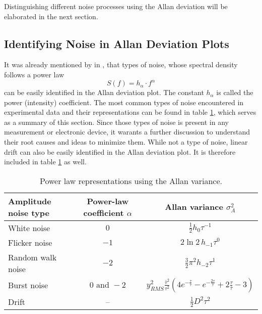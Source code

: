 Distinguishing different noise processes using the Allan deviation will be elaborated in the next section.

\subsection{Identifying Noise in Allan Deviation Plots}
It was already mentioned by \citeauthor{adev} in \cite{adev}, that types of noise, whose spectral density follows a power law
\begin{equation}
    S(f) = h_{\alpha} \cdot f^\alpha \label{eqn:power_law}
\end{equation}
can be easily identified in the Allan deviation plot. The constant $h_\alpha$ is called the power (intensity) coefficient. The most common types of noise encountered in experimental data and their representations can be found in table \ref{tab:adev_alpha}, which serves as a summary of this section. Since those types of noise is present in any measurement or electronic device, it warants a further discussion to understand their root causes and ideas to minimize them. While not a type of noise, linear drift can also be easily identified in the Allan deviation plot. It is therefore included in table \ref{tab:adev_alpha} as well.

\begin{table}[ht]
    \centering
    \begin{tabular}{lcc}
        \toprule
        Amplitude noise type& Power-law coefficient $\alpha$& Allan variance $\sigma_A^2$\\
        \midrule
            White noise & $0$& $\frac 1 2 h_0 \tau^{-1}$ \cite{adev_noise_types}\\
            Flicker noise& $-1$& $2 \ln 2 \, h_{-1} \tau^0$ \cite{adev_noise_types}\\
            Random walk noise& $-2$& $\frac 3 2 \pi^2 h_{-2} \tau^{1}$ \cite{adev_noise_types}\\
            Burst noise& $0 \textrm{ and } -\!2$& $y_{RMS}^2\frac{\bar \tau^2}{\tau^2} \left(4 e^{-\frac{\tau}{\bar \tau}} - e^{-\frac{2 \tau}{\bar \tau}} + 2 \frac{\tau}{\bar \tau} - 3 \right)$\\
            Drift & --& $\frac 1 2 D^2 \tau^2$ \cite{adev_drift}\\
        \bottomrule
    \end{tabular}
    \caption{Power law representations using the Allan variance.}
    \label{tab:adev_alpha}
\end{table}

